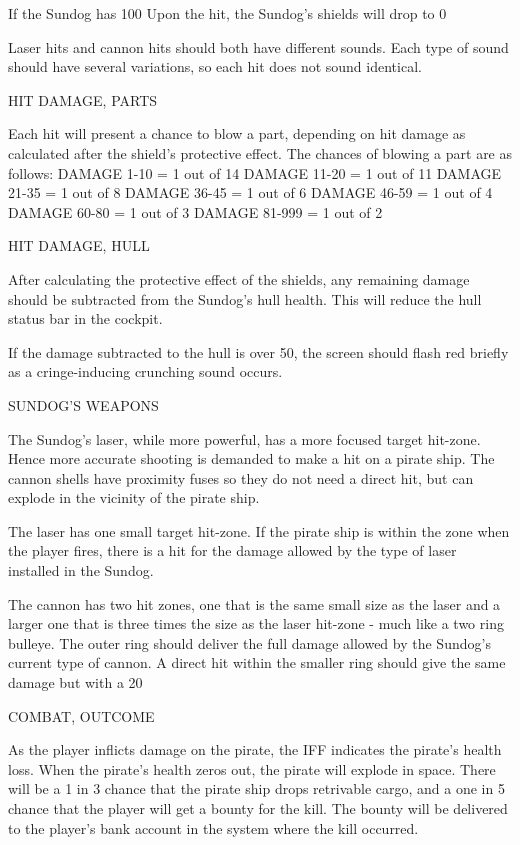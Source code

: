 \begin{itemize}
If the Sundog has 100%
Upon the hit, the Sundog's shields will drop to 0%

Laser hits and cannon hits should both have different sounds. Each type of sound should have several variations, so each hit does not sound identical. 

HIT DAMAGE, PARTS

Each hit will present a chance to blow a part, depending on hit damage as calculated after the shield's protective effect. The chances of blowing a part are as follows: 
DAMAGE 1-10 = 1 out of 14
DAMAGE 11-20 = 1 out of 11
DAMAGE 21-35 = 1 out of 8
DAMAGE 36-45 = 1 out of 6 
DAMAGE 46-59 = 1 out of 4
DAMAGE 60-80 = 1 out of 3
DAMAGE 81-999 = 1 out of 2

HIT DAMAGE, HULL

After calculating the protective effect of the shields, any remaining damage should be subtracted from the Sundog's hull health. This will reduce the hull status bar in the cockpit. 

If the damage subtracted to the hull is over 50, the screen should flash red briefly as a cringe-inducing crunching sound occurs. 


SUNDOG'S WEAPONS

The Sundog's laser, while more powerful, has a more focused target hit-zone. Hence more accurate shooting is demanded to make a hit on a pirate ship. The cannon shells have proximity fuses so they do not need a direct hit, but can explode in the vicinity of the pirate ship. 

The laser has one small target hit-zone.  If the pirate ship is within the zone when the player fires, there is a hit for the damage allowed by the type of laser installed in the Sundog. 

The cannon has two hit zones, one that is the same small size as the laser and a larger one that is three times the size as the laser hit-zone - much like a two ring bulleye. The outer ring should deliver the full damage allowed by the Sundog's current type of cannon. A direct hit within the smaller ring should give the same damage but with a 20%


COMBAT, OUTCOME

As the player inflicts damage on the pirate, the IFF indicates the pirate's health loss. When the pirate's health zeros out, the pirate will explode in space. There will be a 1 in 3 chance that the pirate ship drops retrivable cargo, and a one in 5 chance that the player will get a bounty for the kill. The bounty will be delivered to the player's bank account in the system where the kill occurred. 




\end{itemize}
